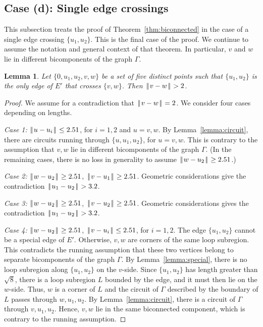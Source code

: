 \documentclass[11pt]{amsart}
\def\|{{\hskip0.1em|\hskip-0.15em|\hskip0.1em}}
\newtheorem{lemma}{Lemma}
\begin{document}
\subsection{Case (d): Single edge crossings}\label{sec:11}

This subsection treats the proof of Theorem~\ref{thm:biconnected}
in the case of a single edge crossing $\{u_1,u_2\}$.  This is
the final case of the proof.
We continue to assume the notation and general context of that theorem.
In particular,  $v$ and $w$ lie in different bicomponents of
the graph $\Gamma$.

\begin{lemma}  Let $\{0,u_1,u_2,v,w\}$ be a set of five distinct
points such that $\{u_1,u_2\}$ is the only edge of $E'$ that
crosses $\{v,w\}$.  Then $\|v-w\|>2$.
\end{lemma}

\begin{proof} We assume for a contradiction that $\|v-w\|=2$.
We consider four cases depending on lengths.  

{\it Case 1:} $\|u-u_i\|\le 2.51$, for $i=1,2$ and $u=v,w$.
By Lemma~\ref{lemma:circuit}, there are circuits running through
$\{u,u_1,u_2\}$, for $u=v,w$.  This is contrary to the assumption
that $v,w$ lie in different bicomponents of the graph $\Gamma$.  (In the remaining cases, there is
no loss in generality to assume $\|w-u_2\|\ge 2.51$.)

{\it Case 2:} $\|w-u_2\|\ge 2.51$, $\|v-u_1\|\ge 2.51$.
Geometric considerations give the contradiction
$\|u_1-u_2\|>3.2$.

{\it Case 3:} $\|w-u_2\|\ge 2.51$, $\|v-u_2\|\ge 2.51$.
Geometric considerations gives the contradiction
$\|u_1-u_2\|>3.2$.

{\it Case 4:} $\|w-u_2\|\ge 2.51$, $\|v-u_i\|\le 2.51$, for $i=1,2$.
The edge $\{u_1,u_2\}$ cannot be a special edge of $E'$.  Otherwise,
$v,w$ are corners of the same loop subregion.  This contradicts
the running assumption that these two vertices belong to separate
bicomponents of the graph $\Gamma$.  By Lemma~\ref{lemma:special}, there is no loop subregion along $\{u_1,u_2\}$ on the $v$-side.
Since $\{u_1,u_2\}$ has length greater than $\sqrt8$, there
is a loop subregion $L$ bounded by the edge, and it must then lie
on the $w$-side.  Thus, $w$ is a corner of $L$ and the circuit of
$\Gamma$ described by the boundary of $L$ passes through $w,u_1,u_2$.
By Lemma~\ref{lemma:circuit}, there is a circuit of $\Gamma$ through
$v,u_1,u_2$.  Hence, $v,w$ lie in the same biconnected component,
which is contrary to the running assumption.
\end{proof}
\end{document}
